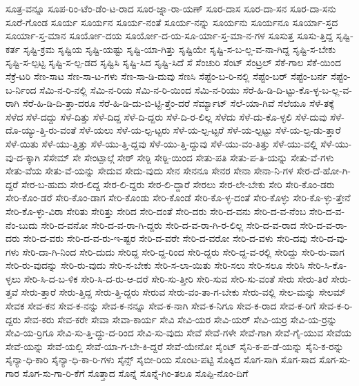 {ಸೂತ್ರ-ವನ್ನೂ
ಸೂಪ-ರಿಂ-ಟೆಂ-ಡೆಂ-ಟ-ರಾದ
ಸೂರ-ಜ್ನಾ-ರಾ-ಯಣ್
ಸೂರ-ದಾಸ
ಸೂರ-ದಾ-ಸನ
ಸೂರ-ದಾ-ಸನು
ಸೂರೆ-ಗೊಂಡ
ಸೂರ್ಯ
ಸೂರ್ಯನ
ಸೂರ್ಯ-ನಂತೆ
ಸೂರ್ಯ-ನನ್ನು
ಸೂರ್ಯನು
ಸೂರ್ಯನೂ
ಸೂರ್ಯಾ-ಸ್ತದ
ಸೂರ್ಯಾ-ಸ್ತ-ಮಾನ
ಸೂರ್ಯೋ-ದಯ
ಸೂರ್ಯೋ-ದ-ಯ-ಸೂ-ರ್ಯಾ-ಸ್ತ-ಮಾ-ನ-ಗಳ
ಸೂಸುತ್ತ
ಸೂಸು-ತ್ತಿದ್ದ
ಸೃಷ್ಟಿ-ಕರ್ತ
ಸೃಷ್ಟಿ-ಕ್ರಮ
ಸೃಷ್ಟಿಯ
ಸೃಷ್ಟಿ-ಯಷ್ಟು
ಸೃಷ್ಟಿ-ಯಾ-ಗಿತ್ತು
ಸೃಷ್ಟಿಯೇ
ಸೃಷ್ಟಿ-ಸ-ಬ-ಲ್ಲ-ವ-ನಾ-ಗಿದ್ದ
ಸೃಷ್ಟಿ-ಸ-ಬೇಕು
ಸೃಷ್ಟಿ-ಸ-ಲ್ಪಟ್ಟ
ಸೃಷ್ಟಿ-ಸ-ಲ್ಪ-ಡದ
ಸೃಷ್ಟಿಸಿ
ಸೃಷ್ಟಿ-ಸಿದ
ಸೃಷ್ಟಿ-ಸಿದೆ
ಸೆ
ಸೆಂಚುರಿ
ಸೆಂಟ್
ಸೆಂಟ್ರಲ್
ಸೆಕೆ-ಗಾಲ
ಸೆಕೆ-ಯಿಂದ
ಸೆಕ್ರೆ-ಟರಿ
ಸೆಣ-ಸಾಟ
ಸೆಣ-ಸಾ-ಟ-ಗಳು
ಸೆಣ-ಸಾ-ಡಿ-ದುವು
ಸೆಣಸಿ
ಸೆಪ್ಟೆಂ-ಬ-ರಿ-ನಲ್ಲಿ
ಸೆಪ್ಟೆಂ-ಬರ್
ಸೆಪ್ಟೆಂ-ಬರ್ನ
ಸೆಪ್ಟೆಂ-ಬ-ರ್ನಿಂದ
ಸೆಮಿ-ನ-ರಿ-ನಲ್ಲಿ
ಸೆಮಿ-ನ-ರಿಯ
ಸೆಮಿ-ನ-ರಿ-ಯಿಂದ
ಸೆಮಿ-ನ-ರಿಯು
ಸೆರೆ-ಹಿ-ಡಿ-ದಿ-ಟ್ಟು-ಕೊ-ಳ್ಳ-ಬ-ಲ್ಲ-ವ-ರಾಗಿ
ಸೆರೆ-ಹಿ-ಡಿ-ದಿ-ತ್ತಾ-ದರೂ
ಸೆರೆ-ಹಿ-ಡಿ-ದು-ಬಿ-ಟ್ಟಿ-ತ್ತೆಂ-ದರೆ
ಸೆರ್ಮ್ಯಾಟ್
ಸೆಲೆ-ಯಾ-ಗಿವೆ
ಸೆಲೆಯೂ
ಸೆಳೆ-ತಕ್ಕೆ
ಸೆಳೆದ
ಸೆಳೆ-ದದ್ದು
ಸೆಳೆ-ದಿತ್ತು
ಸೆಳೆ-ದಿದ್ದ
ಸೆಳೆ-ದಿ-ದ್ದರು
ಸೆಳೆ-ದಿ-ರ-ಲಿಲ್ಲ
ಸೆಳೆದು
ಸೆಳೆ-ದು-ಕೊ-ಳ್ಳಲಿ
ಸೆಳೆ-ದುವು
ಸೆಳೆ-ದೊ-ಯ್ಯು-ತ್ತಿ-ರು-ವಂತೆ
ಸೆಳೆ-ಯಲು
ಸೆಳೆ-ಯ-ಲ್ಪ-ಟ್ಟರು
ಸೆಳೆ-ಯ-ಲ್ಪ-ಟ್ಟರೆ
ಸೆಳೆ-ಯ-ಲ್ಪಟ್ಟು
ಸೆಳೆ-ಯ-ಲ್ಪ-ಡು-ತ್ತಾರೆ
ಸೆಳೆ-ಯಿತು
ಸೆಳೆ-ಯು-ತ್ತಿತ್ತು
ಸೆಳೆ-ಯು-ತ್ತಿ-ದ್ದವು
ಸೆಳೆ-ಯು-ತ್ತಿ-ದ್ದುವು
ಸೆಳೆ-ಯು-ವಂ-ತಿತ್ತು
ಸೆಳೆ-ಯು-ವಲ್ಲಿ
ಸೆಳೆ-ಯು-ವು-ದ-ಕ್ಕಾಗಿ
ಸೆಸೇಮ್
ಸೇ
ಸೇಂಟ್ಪಾಲ್ಗೆ
ಸೇಠ್
ಸೇಠ್ಜಿ
ಸೇಠ್ಜಿ-ಯಿಂದ
ಸೇತು-ಪತಿ
ಸೇತು-ಪ-ತಿ-ಯನ್ನು
ಸೇತು-ವೆ-ಗಳು
ಸೇತು-ವೆಯ
ಸೇತು-ವೆ-ಯನ್ನು
ಸೇದುವ
ಸೇದು-ವುದು
ಸೇನ
ಸೇನನೂ
ಸೇನರ
ಸೇನಾ
ಸೇನಾ-ನಿ-ಗಳ
ಸೇರ-ದೆ-ಹೋ-ಗಿ-ದ್ದರೆ
ಸೇರ-ಬ-ಹುದು
ಸೇರ-ಲಿದ್ದ
ಸೇರ-ಲಿ-ದ್ದರು
ಸೇರ-ಲಿ-ದ್ದಾರೆ
ಸೇರಲು
ಸೇರ-ಲೇ-ಬೇಕು
ಸೇರಿ
ಸೇರಿ-ಕೊಂ-ಡರು
ಸೇರಿ-ಕೊಂ-ಡರೆ
ಸೇರಿ-ಕೊಂ-ಡಾಗ
ಸೇರಿ-ಕೊಂಡು
ಸೇರಿ-ಕೊಂಡೆ
ಸೇರಿ-ಕೊ-ಳ್ಳ-ದಂತೆ
ಸೇರಿ-ಕೊಳ್ಳು
ಸೇರಿ-ಕೊ-ಳ್ಳು-ತ್ತೇನೆ
ಸೇರಿ-ಕೊ-ಳ್ಳು-ವಿರಾ
ಸೇರಿತು
ಸೇರಿತ್ತು
ಸೇರಿದ
ಸೇರಿ-ದಂತೆ
ಸೇರಿ-ದರು
ಸೇರಿ-ದ-ವನು
ಸೇರಿ-ದ-ವ-ನೆಂಬ
ಸೇರಿ-ದ-ವ-ನೆಂ-ಬುದು
ಸೇರಿ-ದ-ವನೋ
ಸೇರಿ-ದ-ವ-ರಾ-ಗಿ-ದ್ದರು
ಸೇರಿ-ದ-ವ-ರಾ-ಗಿ-ರ-ಲಿಲ್ಲ
ಸೇರಿ-ದ-ವ-ರಾದ
ಸೇರಿ-ದ-ವ-ರಾ-ದರು
ಸೇರಿ-ದ-ವರು
ಸೇರಿ-ದ-ವ-ರು-ಇ-ಷ್ಟರ
ಸೇರಿ-ದ-ವರೇ
ಸೇರಿ-ದ-ವರೋ
ಸೇರಿ-ದ-ವಳು
ಸೇರಿ-ದವು
ಸೇರಿ-ದ-ವು-ಗಳು
ಸೇರಿ-ದಾ-ಗಿ-ನಿಂದ
ಸೇರಿ-ದುದು
ಸೇರಿದ್ದ
ಸೇರಿ-ದ್ದ-ರಿಂದ
ಸೇರಿ-ದ್ದರು
ಸೇರಿ-ದ್ದ-ವ-ರಲ್ಲಿ
ಸೇರಿದ್ದು
ಸೇರಿ-ರು-ವಾಗ
ಸೇರಿ-ರು-ವುದನ್ನು
ಸೇರಿ-ರು-ವುದು
ಸೇರಿ-ಸ-ಬೇಕು
ಸೇರಿ-ಸ-ಲಾ-ಯಿತು
ಸೇರಿ-ಸಲು
ಸೇರಿ-ಸಲೂ
ಸೇರಿಸಿ
ಸೇರಿ-ಸಿ-ಕೊ-ಳ್ಳಲು
ಸೇರಿ-ಸಿ-ದ-ಬ-ಳಿಕ
ಸೇರಿ-ಸಿ-ದ-ರು-ಆ-ದರೆ
ಸೇರಿ-ಸು-ತ್ತೀರಿ
ಸೇರಿ-ಸುವ
ಸೇರಿ-ಸು-ವಂತೆ
ಸೇರು
ಸೇರು-ತಿರೆ
ಸೇರು-ತ್ತವೆ
ಸೇರು-ತ್ತಾರೆ
ಸೇರು-ತ್ತಿದ್ದ
ಸೇರು-ತ್ತಿ-ದ್ದರು
ಸೇರುವ
ಸೇರು-ವಂ-ತಾ-ಗ-ಬೇಕು
ಸೇರು-ವಲ್ಲಿ
ಸೇಲ-ಮನ್ನು
ಸೇಲಮ್
ಸೇವಕ
ಸೇವ-ಕನ
ಸೇವ-ಕ-ನನ್ನು
ಸೇವ-ಕ-ನನ್ನೂ
ಸೇವ-ಕ-ನಾಗಿ
ಸೇವ-ಕ-ನಿಗೂ
ಸೇವ-ಕ-ರಾದ
ಸೇವ-ಕ-ರಿಗೆ
ಸೇವ-ಕ-ರಿ-ದ್ದರು
ಸೇವ-ಕರು
ಸೇವ-ಕರೇ
ಸೇವಾ
ಸೇವಾ-ಕಾರ್ಯ
ಸೇವಿ
ಸೇವಿ-ಯರ
ಸೇವಿ-ಯರ್
ಸೇವಿ-ಯರ್ರ
ಸೇವಿ-ಯ-ರ್ರನ್ನು
ಸೇವಿ-ಯ-ರ್ರಿಗೂ
ಸೇವಿ-ಸು-ತ್ತಿ-ದ್ದು-ದ-ರಿಂದ
ಸೇವಿ-ಸು-ವುದು
ಸೇವೆ
ಸೇವೆ-ಗಳೇ
ಸೇವೆ-ಗಾಗಿ
ಸೇವೆ-ಗೈ-ಯುವ
ಸೇವೆಯ
ಸೇವೆ-ಯನ್ನು
ಸೇವೆ-ಯಲ್ಲಿ
ಸೇವೆ-ಯಾ-ಗ-ಬೇ-ಕಿ-ದ್ದರೆ
ಸೇವೆ-ಯೇನೋ
ಸೈಂಟ್
ಸೈನಿ-ಕ-ಪ-ಡೆ-ಯನ್ನು
ಸೈನಿ-ಕ-ರನ್ನು
ಸೈನ್ಯಾ-ಧಿ-ಕಾರಿ
ಸೈನ್ಯಾ-ಧಿ-ಕಾ-ರಿ-ಗಳು
ಸೈನ್ಸ್
ಸೈಬೀ-ರಿಯ
ಸೊಂಟ-ಪಟ್ಟಿ
ಸೊಕ್ಕಿದ
ಸೊಗ-ಸಾಗಿ
ಸೊಗ-ಸಾದ
ಸೊಗ-ಸು-ಗಾರ
ಸೊಗ-ಸು-ಗಾ-ರಿ-ಕೆಗೆ
ಸೊತ್ತಾದ
ಸೊನ್ನೆ
ಸೊನ್ನೆ-ಗಿಂ-ತಲೂ
ಸೊಪ್ಪಿ-ನೊಂ-ದಿಗೆ
}
